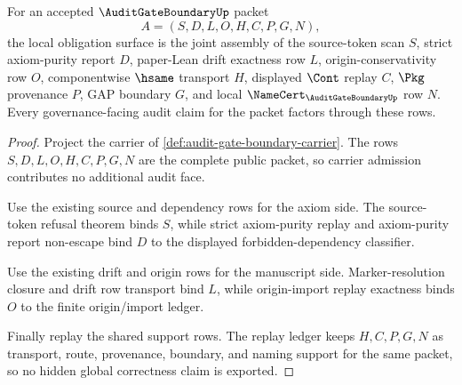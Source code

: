 \begin{theorem}
\label{thm:audit-gate-boundary-obligation-closure}
For an accepted $\AuditGateBoundaryUp$ packet
$$
A=(S,D,L,O,H,C,P,G,N),
$$
the local obligation surface is the joint assembly of the source-token scan $S$, strict axiom-purity report $D$, paper-Lean drift exactness row $L$, origin-conservativity row $O$, componentwise $\hsame$ transport $H$, displayed $\Cont$ replay $C$, $\Pkg$ provenance $P$, GAP boundary $G$, and local $\NameCert_{\AuditGateBoundaryUp}$ row $N$. Every governance-facing audit claim for the packet factors through these rows.
\end{theorem}
\begin{proof}
Project the carrier of \autoref{def:audit-gate-boundary-carrier}. The rows $S,D,L,O,H,C,P,G,N$ are the complete public packet, so carrier admission contributes no additional audit face.

Use the existing source and dependency rows for the axiom side. The source-token refusal theorem binds $S$, while strict axiom-purity replay and axiom-purity report non-escape bind $D$ to the displayed forbidden-dependency classifier.

Use the existing drift and origin rows for the manuscript side. Marker-resolution closure and drift row transport bind $L$, while origin-import replay exactness binds $O$ to the finite origin/import ledger.

Finally replay the shared support rows. The replay ledger keeps $H,C,P,G,N$ as transport, route, provenance, boundary, and naming support for the same packet, so no hidden global correctness claim is exported.
\end{proof}

